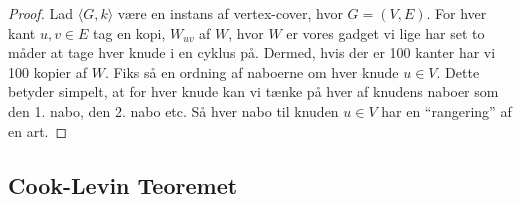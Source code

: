 \begin{proof}
  Lad $\langle G,k \rangle $ være en instans af vertex-cover, hvor $G = (V,E)$. For hver kant $u,v \in E$ tag en kopi, $W_{uv}$ af $W$, hvor $W$ er vores gadget vi lige har set to måder at tage hver knude i en cyklus på. Dermed, hvis der er 100 kanter har vi 100 kopier af $W$. Fiks så en ordning af naboerne om hver knude $u \in V$. Dette betyder simpelt, at for hver knude kan vi tænke på hver af knudens naboer som den 1. nabo, den 2. nabo etc. Så hver nabo til knuden $u \in V$ har en ``rangering'' af en art.

\end{proof}

\subsection{Cook-Levin Teoremet}%
\label{subsec:cooklevin}







